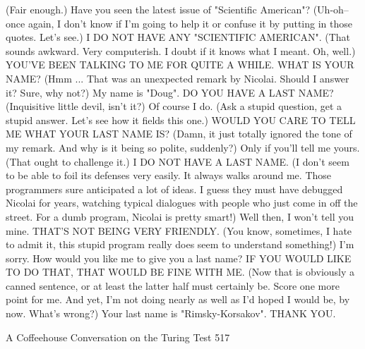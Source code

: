 (Fair enough.)
Have you seen the latest issue of "Scientific American"?
(Uh-oh--once again, I don't know if I'm going to help it or confuse it by putting in
those quotes. Let's see.)
I DO NOT HAVE ANY "SCIENTIFIC AMERICAN".
(That sounds awkward. Very computerish. I doubt if it knows what I meant. Oh, well.)
YOU'VE BEEN TALKING TO ME FOR QUITE A WHILE. WHAT IS YOUR
NAME?
(Hmm ... That was an unexpected remark by Nicolai. Should I answer it? Sure, why
not?)
My name is "Doug".
DO YOU HAVE A LAST NAME?
(Inquisitive little devil, isn't it?)
Of course I do.
(Ask a stupid question, get a stupid answer. Let's see how it fields this one.)
WOULD YOU CARE TO TELL ME WHAT YOUR LAST NAME IS?
(Damn, it just totally ignored the tone of my remark. And why is it being so polite,
suddenly?)
Only if you'll tell me yours.
(That ought to challenge it.)
I DO NOT HAVE A LAST NAME.
(I don't seem to be able to foil its defenses very easily. It always walks around me.
Those programmers sure anticipated a lot of ideas. I guess they must have debugged
Nicolai for years, watching typical dialogues with people who just come in off the
street. For a dumb program, Nicolai is pretty smart!)
Well then, I won't tell you mine.
THAT'S NOT BEING VERY FRIENDLY.
(You know, sometimes, I hate to admit it, this stupid program really does seem to
understand something!)
I'm sorry. How would you like me to give you a last name?
IF YOU WOULD LIKE TO DO THAT, THAT WOULD BE FINE WITH ME.
(Now that is obviously a canned sentence, or at least the latter half must certainly be.
Score one more point for me. And yet, I'm not doing nearly as well as I'd hoped I
would be, by now. What's wrong?)
Your last name is "Rimsky-Korsakov".
THANK YOU.




A Coffeehouse Conversation on the Turing Test                                       517


